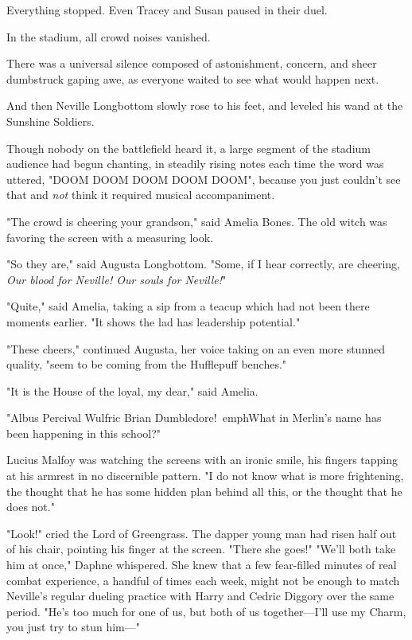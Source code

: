 Everything stopped. Even Tracey and Susan paused in their duel.

In the stadium, all crowd noises vanished.

There was a universal silence composed of astonishment, concern, and sheer 
dumbstruck gaping awe, as everyone waited to see what would happen next.

And then Neville Longbottom slowly rose to his feet, and leveled his wand at 
the Sunshine Soldiers.

Though nobody on the battlefield heard it, a large segment of the stadium 
audience had begun chanting, in steadily rising notes each time the word was 
uttered, "DOOM DOOM DOOM DOOM DOOM", because you just couldn't see that and 
\emph{not} think it required musical accompaniment.

"The crowd is cheering your grandson," said Amelia Bones. The old witch was 
favoring the screen with a measuring look.

"So they are," said Augusta Longbottom. "Some, if I hear correctly, are 
cheering, \emph{Our blood for Neville! Our souls for Neville!}"

"Quite," said Amelia, taking a sip from a teacup which had not been there 
moments earlier. "It shows the lad has leadership potential."

"These cheers," continued Augusta, her voice taking on an even more stunned 
quality, "seem to be coming from the Hufflepuff benches."

"It is the House of the loyal, my dear," said Amelia.

"Albus Percival Wulfric Brian Dumbledore!\ emph{What in Merlin's name has been 
happening in this school?}"

Lucius Malfoy was watching the screens with an ironic smile, his fingers 
tapping at his armrest in no discernible pattern. "I do not know what is more 
frightening, the thought that he has some hidden plan behind all this, or the 
thought that he does not."

"Look!" cried the Lord of Greengrass. The dapper young man had risen half out 
of his chair, pointing his finger at the screen. "There she goes!"
\sbreak
"We'll both take him at once," Daphne whispered. She knew that a few 
fear-filled minutes of real combat experience, a handful of times each week, 
might not be enough to match Neville's regular dueling practice with Harry and 
Cedric Diggory over the same period. "He's too much for one of us, but both of 
us together---I'll use my Charm, you just try to stun him---"

